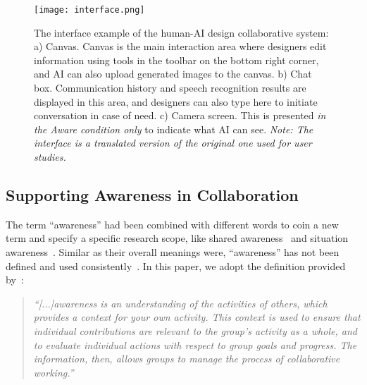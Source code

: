 \begin{figure*}[!th]
    \centering
    \texttt{[image: interface.png]}
    \caption{The interface example of the human-AI design collaborative system: a) Canvas. Canvas is the main interaction area where designers edit information using tools in the toolbar on the bottom right corner, and AI can also upload generated images to the canvas. b) Chat box. Communication history and speech recognition results are displayed in this area, and designers can also type here to initiate conversation in case of need. c) Camera screen. This is presented \textit{in the Aware condition only} to indicate what AI can see. \textit{Note: The interface is a translated version of the original one used for user studies.}}
    \label{fig:interface}
\end{figure*}


\subsection{Supporting Awareness in Collaboration}
The term ``awareness'' had been combined with different words to coin a new term and specify a specific research scope, like shared awareness~\cite{Chakrabarti1994Two} and situation awareness~\cite{Endsley1988Design}. Similar as their overall meanings were, ``awareness'' has not been defined and used consistently~\cite{Gross2013Supporting}. In this paper, we adopt the definition provided by~\citet[p.~107]{Dourish1992awareness}:

\begin{quote}
    \textit{``[...]awareness is an understanding of the activities of others, which provides a context for your own activity. This context is used to ensure that individual contributions are relevant to the group's activity as a whole, and to evaluate individual actions with respect to group goals and progress. The information, then, allows groups to manage the process of collaborative working.''}
\end{quote}

